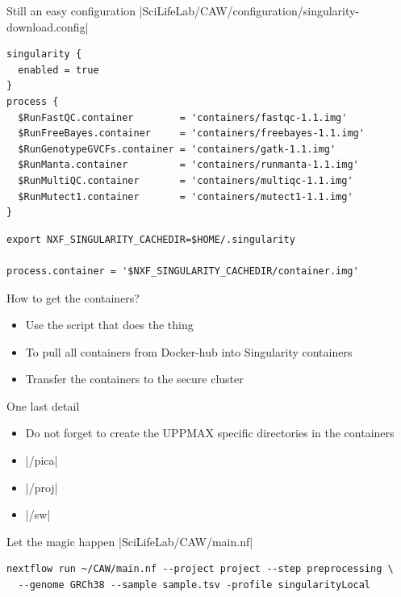 \documentclass{beamer}
\begin{document}
\begin{frame}[fragile]{Still an easy configuration}
	|SciLifeLab/CAW/configuration/singularity-download.config|
\begin{verbatim}
singularity {
  enabled = true
}
process {
  $RunFastQC.container        = 'containers/fastqc-1.1.img'
  $RunFreeBayes.container     = 'containers/freebayes-1.1.img'
  $RunGenotypeGVCFs.container = 'containers/gatk-1.1.img'
  $RunManta.container         = 'containers/runmanta-1.1.img'
  $RunMultiQC.container       = 'containers/multiqc-1.1.img'
  $RunMutect1.container       = 'containers/mutect1-1.1.img'
}
\end{verbatim}

\begin{verbatim}
export NXF_SINGULARITY_CACHEDIR=$HOME/.singularity

process.container = '$NXF_SINGULARITY_CACHEDIR/container.img'
\end{verbatim}
\end{frame}

\begin{frame}{How to get the containers?}
	\begin{itemize}
		\item Use the script that does the thing
		\pause
		\item To pull all containers from Docker-hub into Singularity containers
		\pause
		\item Transfer the containers to the secure cluster
	\end{itemize}
\end{frame}

\begin{frame}{One last detail}
	\begin{itemize}
		\item Do not forget to create the UPPMAX specific directories in the containers
		\pause
		\item {}|/pica|
		\item {}|/proj|
		\item {}|/sw|
	\end{itemize}
\end{frame}

\begin{frame}[fragile]{Let the magic happen}
|SciLifeLab/CAW/main.nf|
\begin{verbatim}
nextflow run ~/CAW/main.nf --project project --step preprocessing \
  --genome GRCh38 --sample sample.tsv -profile singularityLocal
\end{verbatim}
\end{frame}
\end{document}
